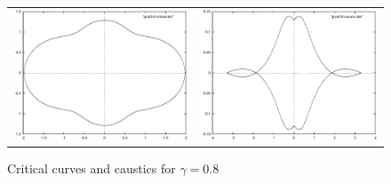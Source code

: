 \documentclass[a4paper]{IEEEtran}
\begin{document}
    \begin{figure}
        \caption{Critical curves and caustics for $\gamma = 0.8$}
        \label{fig:critical-gamma08}
        \begin{center}
            \begin{tabular}{cc}
                \includegraphics[width=\columnwidth]{images/pos0-8-critical.eps} &
                \includegraphics[width=\columnwidth]{images/pos0-8-caustic.eps} 
            \end{tabular} 
        \end{center}
    \end{figure}
\end{document}
